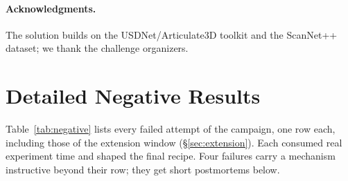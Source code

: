 \documentclass[11pt]{article}
\begin{document}
\paragraph{Acknowledgments.} The solution builds on the USDNet/Articulate3D toolkit and the ScanNet++
dataset; we thank the challenge organizers.

\clearpage
\appendix

\section{Detailed Negative Results}
\label{sec:negative}

Table~\ref{tab:negative} lists every failed attempt of the campaign, one
row each, including those of the extension window (\S\ref{sec:extension}).
Each consumed real experiment time and shaped the final recipe. Four
failures carry a mechanism instructive beyond their row; they get short
postmortems below.
\end{document}
